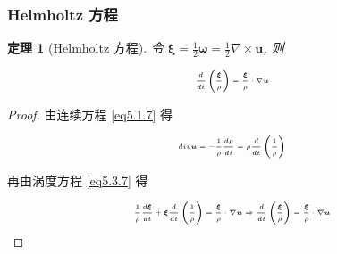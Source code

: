 \documentclass[aspectratio=2516]{beamer}
\newtheorem{thm}{\kaishu 定理}
\begin{document}

\begin{frame}
\frametitle{\kaishu Helmholtz 方程}

\vspace{-0.25cm}

\kaishu

\small 


\begin{thm}[\kaishu Helmholtz 方程]
	
	\kaishu
	
	令 $ \boldsymbol{\xi}  = \frac{1}{2}\boldsymbol{\omega}  = \frac{1}{2}\nabla  \times \boldsymbol{u}$, 则
	
	\begin{equation}
	\tiny 
	\frac{d}{{dt}}\left( {\frac{\boldsymbol{\xi} }{\rho }} \right) = \frac{\boldsymbol{\xi} }{\rho } \cdot \nabla \boldsymbol{u}
	\label{eq5.3.11}
	\end{equation}
\end{thm}

\begin{proof}
	
	\kaishu
	
	由连续方程 \ref{eq5.1.7} 得
	
	\begin{equation}
	\tiny
	div \boldsymbol{u} =  - \frac{1}{\rho }\frac{{d\rho }}{{dt}} = \rho \frac{d}{{dt}}\left( {\frac{1}{\rho }} \right)
	\notag 
	\end{equation}
	
	再由涡度方程 \ref{eq5.3.7} 得
	
	\begin{equation}
	\tiny 
	\frac{1}{\rho }\frac{{d\boldsymbol{\xi} }}{{dt}} + \boldsymbol{\xi} \frac{d}{{dt}}\left( {\frac{1}{\rho }} \right) = \frac{\boldsymbol{\xi} }{\rho } \cdot \nabla \boldsymbol{u} \Rightarrow \frac{d}{{dt}}\left( {\frac{\boldsymbol{\xi} }{\rho }} \right) = \frac{\boldsymbol{\xi} }{\rho } \cdot \nabla \boldsymbol{u}
	\notag 
	\end{equation}
	
	
\end{proof}

\end{frame}

\end{document}
